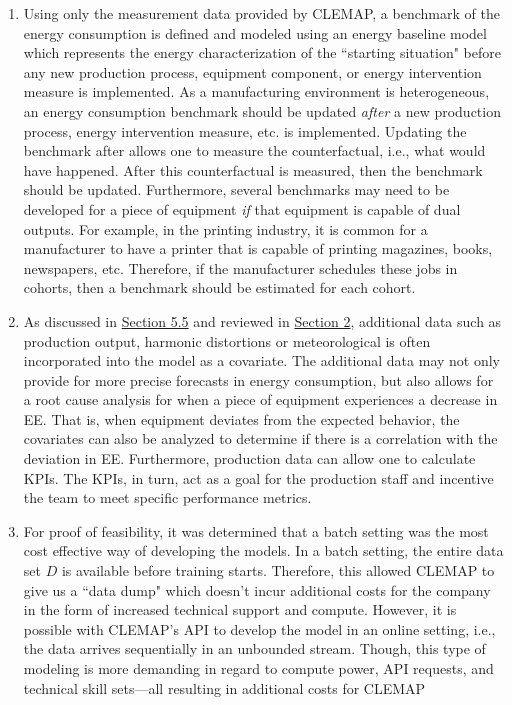 \begin{enumerate}
    \item Using only the measurement data provided by CLEMAP, a benchmark of the energy consumption is defined and modeled using an energy baseline model which represents the energy characterization of the ``starting situation" before any new production process, equipment component, or energy intervention measure is implemented. As a manufacturing environment is heterogeneous, an energy consumption benchmark should be updated \textit{after} a new production process, energy intervention measure, etc. is implemented. Updating the benchmark after allows one to measure the counterfactual, i.e., what would have happened. After this counterfactual is measured, then the benchmark should be updated. Furthermore, several benchmarks may need to be developed for a piece of equipment \textit{if} that equipment is capable of dual outputs. For example, in the printing industry, it is common for a manufacturer to have a printer that is capable of printing magazines, books, newspapers, etc. Therefore, if the manufacturer schedules these jobs in cohorts, then a benchmark should be estimated for each cohort.
    
    \item As discussed in \hyperlink{subsection.5.5}{Section 5.5} and reviewed in \hyperlink{section.2}{Section 2}, additional data such as production output, harmonic distortions or meteorological is often incorporated into the model as a covariate. The additional data may not only provide for more precise forecasts in energy consumption, but also allows for a root cause analysis for when a piece of equipment experiences a decrease in EE. That is, when equipment deviates from the expected behavior, the covariates can also be analyzed to determine if there is a correlation with the deviation in EE. Furthermore, production data can allow one to calculate KPIs. The KPIs, in turn, act as a goal for the production staff and incentive the team to meet specific performance metrics. 
    
    \item For proof of feasibility, it was determined that a batch setting was the most cost effective way of developing the models. In a batch setting, the entire data set $D$ is available before training starts. Therefore, this allowed CLEMAP to give us a ``data dump" which doesn't incur additional costs for the company in the form of increased technical support and compute. However, it is possible with CLEMAP's \ac{API} to develop the model in an online setting, i.e., the data arrives sequentially in an unbounded stream. Though, this type of modeling is more demanding in regard to compute power, API requests, and technical skill sets—all resulting in additional costs for CLEMAP
    

\end{enumerate}
